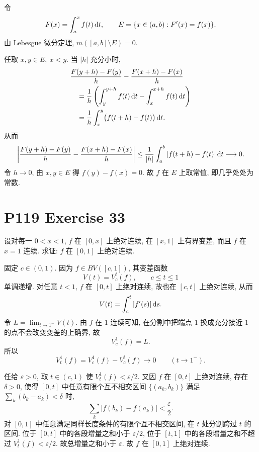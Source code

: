 \documentclass{article}
\begin{document}
\begin{solution}
  令
  \[
    F(x)=\int_a^x f(t)\,\mathrm{d} t,\qquad
    E=\{x\in(a,b):F'(x)=f(x)\}.
  \]
  由 Lebesgue 微分定理, $m([a,b]\setminus E)=0$.

  任取 $x,y\in E,\ x<y$. 当 $|h|$ 充分小时,
  \begin{align*}
    &\frac{F(y+h)-F(y)}{h}
      -\frac{F(x+h)-F(x)}{h}\\
    &\quad=\frac1h\left(\int_y^{y+h}f(t)\,\mathrm{d} t
      -\int_x^{x+h}f(t)\,\mathrm{d} t\right)\\
    &\quad=\frac1h\int_x^y\bigl(f(t+h)-f(t)\bigr)\,\mathrm{d} t.
  \end{align*}
  从而
  \[
    \left|
      \frac{F(y+h)-F(y)}{h}
      -\frac{F(x+h)-F(x)}{h}
    \right|
    \le \frac1{|h|}\int_a^b|f(t+h)-f(t)|\,\mathrm{d} t\longrightarrow0.
  \]
  令 $h\to0$, 由 $x,y\in E$ 得 $f(y)-f(x)=0$.
  故 $f$ 在 $E$ 上取常值, 即几乎处处为常数.
\end{solution}

\section{P119 Exercise 33}

设对每一 $0<x<1$, $f$ 在 $[0,x]$ 上绝对连续, 在 $[x,1]$ 上有界变差,
而且 $f$ 在 $x=1$ 连续. 求证: $f$ 在 $[0,1]$ 上绝对连续.

\begin{solution}
  固定 $c\in(0,1)$. 因为 $f\in BV([c,1])$, 其变差函数
  \[
    V(t)=V_c^t(f),\qquad c\le t\le1
  \]
  单调递增. 对任意 $t<1$, $f$ 在 $[0,t]$ 上绝对连续, 故也在
  $[c,t]$ 上绝对连续, 从而
  \[
    V(t)=\int_c^t|f'(s)|\,\mathrm{d} s.
  \]
  令 $L=\lim_{t\to1^-}V(t)$. 由 $f$ 在 $1$ 连续可知, 在分割中把端点
  $1$ 换成充分接近 $1$ 的点不会改变变差的上确界, 故
  \[
    V_c^1(f)=L.
  \]
  所以
  \[
    V_t^1(f)=V_c^1(f)-V_c^t(f)\longrightarrow0
    \qquad(t\to1^-).
  \]

  任给 $\varepsilon>0$, 取 $t\in(c,1)$ 使
  $V_t^1(f)<\varepsilon/2$. 又因 $f$ 在 $[0,t]$ 上绝对连续,
  存在 $\delta>0$, 使得 $[0,t]$ 中任意有限个互不相交区间
  $\{(a_k,b_k)\}$ 满足 $\sum_k(b_k-a_k)<\delta$ 时,
  \[
    \sum_k|f(b_k)-f(a_k)|<\frac{\varepsilon}{2}.
  \]
  对 $[0,1]$ 中任意满足同样长度条件的有限个互不相交区间,
  在 $t$ 处分割跨过 $t$ 的区间. 位于 $[0,t]$ 中的各段增量之和小于
  $\varepsilon/2$, 位于 $[t,1]$ 中的各段增量之和不超过
  $V_t^1(f)<\varepsilon/2$. 故总增量之和小于 $\varepsilon$.
  故 $f$ 在 $[0,1]$ 上绝对连续.
\end{solution}
\end{document}

